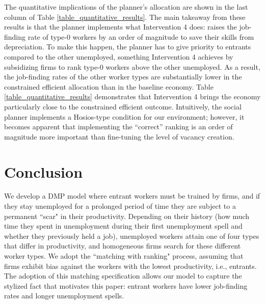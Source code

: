 \documentclass[12pt]{article} %
\theoremstyle{definition}
\begin{document}
The quantitative implications of the planner's allocation are shown in the last column of Table \ref{table_quantitative_results}.
The main takeaway from these results is that the planner implements what Intervention 4 does: raises the job-finding rate of type-0 workers by an order of magnitude to save their skills from depreciation.
To make this happen, the planner has to give priority to entrants compared to the other unemployed, something Intervention 4 achieves by subsidizing firms to rank type-0 workers above the other unemployed.
As a result, the job-finding rates of the other worker types are substantially lower in the constrained efficient allocation than in the baseline economy.
Table \ref{table_quantitative_results} demonstrates that Intervention 4 brings the economy particularly close to the constrained efficient outcome. 
Intuitively, the social planner implements a Hosios-type condition for our environment; however, it becomes apparent that implementing the ``correct'' ranking is an order of magnitude more important than fine-tuning the level of vacancy creation.




\section{Conclusion}\label{section conclusion} 

We develop a DMP model where entrant workers must be trained by firms, and if they stay unemployed for a prolonged period of time they are subject to a permanent ``scar" in their productivity. Depending on their history (how much time they spent in unemployment during their first unemployment spell and whether they previously held a job), unemployed workers attain one of four types that differ in productivity, and homogeneous firms search for these different worker types.
We adopt the \cite{petrongolo2001looking} ``matching with ranking" process, assuming that firms exhibit bias against the workers with the lowest productivity, i.e., entrants. The adoption of this matching specification allows our model to capture the stylized fact that motivates this paper: entrant workers have lower job-finding rates and longer unemployment spells.   
 
\end{document}
